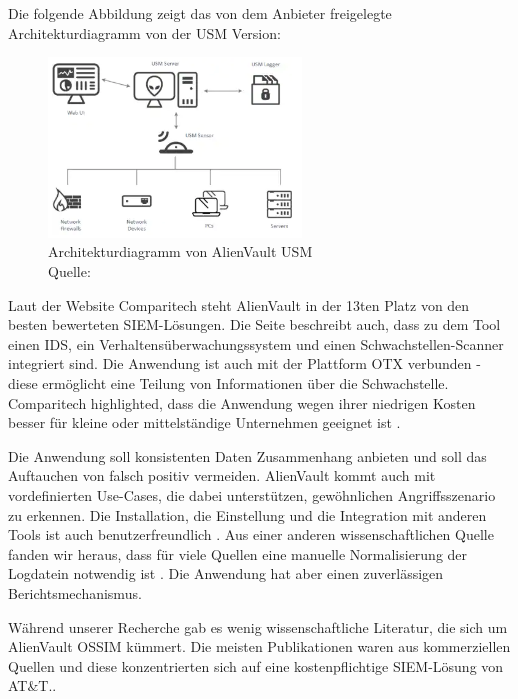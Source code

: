 \newpage
Die folgende Abbildung zeigt das von dem Anbieter freigelegte Architekturdiagramm von der \gls{USM} Version:

\begin{figure}[H]
   \centering
   \includegraphics[width=0.6\textwidth]{assets/2_p6.png}
   \caption[Architekturdiagramm von AlienVault \gls{USM}]
   {Architekturdiagramm von AlienVault \gls{USM} \\Quelle: \citep{ATT_AVO} }
   \centering
\end{figure}

Laut der Website Comparitech steht AlienVault in der 13ten Platz von den besten bewerteten \gls{SIEM}-Lösungen. Die Seite beschreibt auch, dass zu dem Tool einen \gls{IDS}, ein Verhaltensüberwachungssystem und einen Schwachstellen-Scanner integriert sind. Die Anwendung ist auch mit der Plattform \gls{OTX} verbunden - diese ermöglicht eine Teilung von Informationen über die Schwachstelle. Comparitech highlighted, dass die Anwendung wegen ihrer niedrigen Kosten besser für kleine oder mittelständige Unternehmen geeignet ist \citep{comparitech_SIEM}. 

Die Anwendung soll konsistenten Daten Zusammenhang anbieten und soll das Auftauchen von \gls{falsch positiv} vermeiden. AlienVault kommt auch mit vordefinierten Use-Cases, die dabei unterstützen, gewöhnlichen Angriffsszenario zu erkennen. Die Installation, die Einstellung und die Integration mit anderen Tools ist auch benutzerfreundlich \citep{Gomes_AV}. Aus einer anderen wissenschaftlichen Quelle fanden wir heraus, dass für viele Quellen eine manuelle Normalisierung der Logdatein notwendig ist \citep{Nabil_AV}. Die Anwendung hat aber einen zuverlässigen Berichtsmechanismus. 

Während unserer Recherche gab es wenig wissenschaftliche Literatur, die sich um AlienVault OSSIM kümmert. Die meisten Publikationen waren aus kommerziellen Quellen und diese konzentrierten sich auf eine kostenpflichtige \gls{SIEM}-Lösung von AT\&T..

